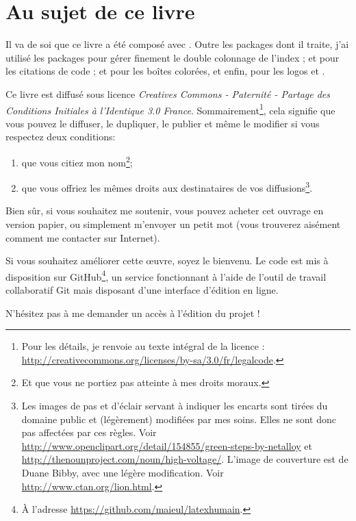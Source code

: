 \section*{Au sujet de ce livre}

Il va de soi que ce livre a été composé avec \XeLaTeX. Outre les packages dont il traite, j'ai utilisé les packages  pour gérer finement le double colonnage de l'index ;  et  pour les citations de code ;  et  pour les boîtes colorées, et enfin,  pour les logos \XeLaTeX et \XeTeX.



Ce livre est diffusé sous licence \emph{Creatives Commons - Paternité - Partage des Conditions Initiales à l'Identique 3.0 France}. Sommairement\footnote{Pour les détails, je renvoie au texte intégral de la licence : \url{http://creativecommons.org/licenses/by-sa/3.0/fr/legalcode}.}, cela signifie que vous pouvez le diffuser, le dupliquer, le publier et même le modifier si vous respectez deux conditions:
\begin{enumerate}
\item que vous citiez mon nom\footnote{Et que vous ne portiez  pas atteinte à mes droits moraux.};
\item que vous offriez les mêmes droits aux destinataires de vos diffusions\footnote{Les images de pas et d'éclair servant à indiquer les encarts sont tirées du domaine public et (légèrement) modifiées par mes soins. Elles ne sont donc pas affectées par ces règles. Voir \url{http://www.openclipart.org/detail/154855/green-steps-by-netalloy} et \url{http://thenounproject.com/noun/high-voltage/}. L'image de couverture est de Duane  Bibby, avec une légère modification. Voir \url{http://www.ctan.org/lion.html}.}.
\end{enumerate}

Bien sûr, si vous souhaitez me soutenir, vous pouvez acheter cet ouvrage en version papier, ou simplement m'envoyer un petit mot (vous trouverez aisément comment me contacter sur Internet).

Si vous souhaitez améliorer cette œuvre, soyez le bienvenu. Le code est mis à disposition sur GitHub\footnote{À l'adresse \url{https://github.com/maieul/latexhumain}.}, un service fonctionnant à l'aide de l'outil de travail collaboratif Git mais disposant d'une interface d'édition en ligne. 

N'hésitez pas à me demander un accès à l'édition du projet ! 

